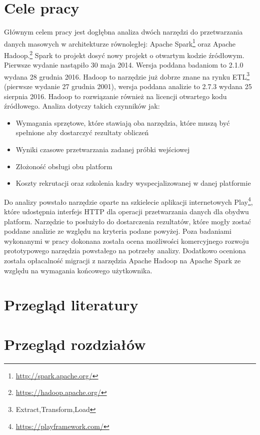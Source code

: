 \section{Cele pracy}
Głównym celem pracy jest dogłębna analiza dwóch narzędzi do przetwarzania danych masowych w architekturze równoległej: Apache Spark\footnote{\url{http://spark.apache.org/}} oraz Apache Hadoop.\footnote{\url{https://hadoop.apache.org/}} Spark to projekt dosyć nowy projekt o otwartym kodzie źródłowym. Pierwsze wydanie nastąpiło 30 maja 2014. Wersja poddana badaniom to 2.1.0 wydana 28 grudnia 2016. Hadoop to narzędzie już dobrze znane na rynku ETL\footnote{Extract,Transform,Load} (pierwsze wydanie 27 grudnia 2001), wersja poddana analizie to 2.7.3 wydana 25 sierpnia 2016. Hadoop to rozwiązanie również na licencji otwartego kodu źródłowego. Analiza dotyczy takich czynników jak:
\begin{itemize}
	\item Wymagania sprzętowe, które stawiają oba narzędzia, które muszą być spełnione aby dostarczyć rezultaty obliczeń
	\item Wyniki czasowe przetwarzania zadanej próbki wejściowej
	\item Złożoność obsługi obu platform
	\item Koszty rekrutacji oraz szkolenia kadry wyspecjalizowanej w danej platformie
\end{itemize}
Do analizy powstało narzędzie oparte na szkielecie aplikacji internetowych Play\footnote{\url{https://playframework.com/}}, które udostępnia interfejs HTTP dla operacji przetwarzania danych dla obydwu platform. Narzędzie to posłużyło do dostarczenia rezultatów, które mogły zostać poddane analizie ze względu na kryteria podane powyżej. Poza badaniami wykonanymi w pracy dokonana została ocena możliwości komercyjnego rozwoju prototypowego narzędzia powstałego na potrzeby analizy. Dodatkowo oceniona została opłacalność migracji z narzędzia Apache Hadoop na Apache Spark ze względu na wymagania końcowego użytkownika. 

\section{Przegląd literatury}
\section{Przegląd rozdziałów}
